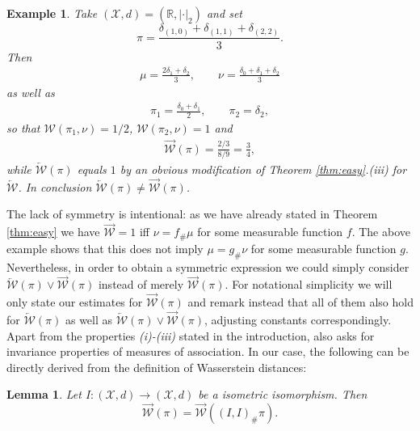 \documentclass[10pt]{amsart}
\newtheorem{lemma}[theorem]{Lemma}
\newtheorem{example}[theorem]{Example}
\newcommand{\R}{\mathbb{R}}
\begin{document}
\begin{example}
Take $(\mathcal{X}, d)=(\R, |\cdot|_2)$ and set $$\pi=\frac{\delta_{(1,0)}+\delta_{(1,1)}+\delta_{(2,2)}}{3}.$$ Then 
\begin{align*}
\mu=\frac{2\delta_1+\delta_2}{3}, \qquad \nu=\frac{\delta_0+\delta_1+\delta_2}{3}
\end{align*} 
as well as 
\begin{align*}
\pi_{1}=\frac{\delta_0+\delta_1}{2}, \qquad \pi_{2} =\delta_2,
\end{align*}
so that $\mathcal{W}(\pi_{1},\nu)=1/2$, $\mathcal{W}(\pi_{2},\nu)=1$ and
\begin{align*}
\overrightarrow{\mathcal{W}}(\pi)=\frac{2/3}{8/9}=\frac{3}{4},
\end{align*}
while $\overleftarrow{\mathcal{W}}(\pi)$ equals $1$ by an obvious modification of Theorem \ref{thm:easy}.(iii) for $\overleftarrow{\mathcal{W}}$. In conclusion $\overleftarrow{\mathcal{W}}(\pi)\neq \overrightarrow{\mathcal{W}}(\pi)$.
\end{example}

The lack of symmetry is intentional: as we have already stated in Theorem \ref{thm:easy} we have $\overrightarrow{\mathcal{W}}=1$ iff $\nu=f_\#\mu$ for some measurable function $f$. The above example shows that this does not imply $\mu=g_\# \nu$ for some measurable function $g$. Nevertheless, in order to obtain a symmetric expression we could simply consider $\overleftarrow{\mathcal{W}}(\pi)\vee \overrightarrow{\mathcal{W}}(\pi)$ instead of merely $\overrightarrow{\mathcal{W}}(\pi)$. For notational simplicity we will only state our estimates for $\overrightarrow{\mathcal{W}}(\pi)$ and remark instead that all of them also hold for $\overleftarrow{\mathcal{W}}(\pi)$ as well as $\overleftarrow{\mathcal{W}}(\pi)\vee \overrightarrow{\mathcal{W}}(\pi)$, adjusting constants correspondingly. \\

Apart from the properties \textit{(i)-(iii)} stated in the introduction, \cite[Property (F)]{mori2019four} also asks for invariance properties of measures of association. In our case, the following can be directly derived from the definition of Wasserstein distances:

\begin{lemma}
Let $I:(\mathcal{X},d)\to (\mathcal{X},d)$ be a isometric isomorphism. Then $$\overrightarrow{\mathcal{W}}(\pi)=\overrightarrow{\mathcal{W}}((I,I)_\#\pi).$$ 
\end{lemma}
\end{document}
